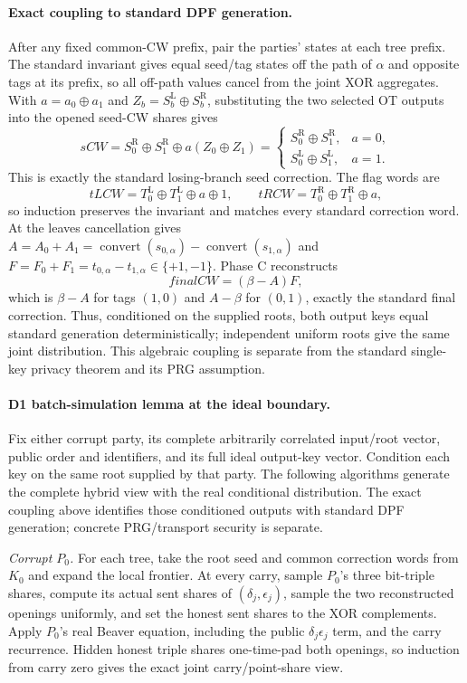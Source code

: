 \documentclass[11pt]{article}
\begin{document}
\paragraph{Exact coupling to standard DPF generation.}
After any fixed common-CW prefix, pair the parties' states at each tree prefix.
The standard invariant gives equal seed/tag states off the path of $\alpha$
and opposite tags at its prefix, so all off-path values cancel from the joint
XOR aggregates. With $a=a_0\oplus a_1$ and
$Z_b=S_b^{\mathrm L}\oplus S_b^{\mathrm R}$, substituting the two selected OT
outputs into the opened seed-CW shares gives
\[
\mathit{sCW}=
S_0^{\mathrm R}\oplus S_1^{\mathrm R}\oplus
a(Z_0\oplus Z_1)
=
\begin{cases}
S_0^{\mathrm R}\oplus S_1^{\mathrm R},&a=0,\\
S_0^{\mathrm L}\oplus S_1^{\mathrm L},&a=1.
\end{cases}
\]
This is exactly the standard losing-branch seed correction. The flag words are
\[
\mathit{tLCW}=T_0^{\mathrm L}\oplus T_1^{\mathrm L}\oplus a\oplus1,
\qquad
\mathit{tRCW}=T_0^{\mathrm R}\oplus T_1^{\mathrm R}\oplus a,
\]
so induction preserves the invariant and matches every standard correction
word. At the leaves cancellation gives
$A=A_0+A_1=\operatorname{convert}(s_{0,\alpha})-\operatorname{convert}(s_{1,\alpha})$ and
$F=F_0+F_1=t_{0,\alpha}-t_{1,\alpha}\in\{+1,-1\}$. Phase C reconstructs
\[
\mathit{finalCW}=(\beta-A)F,
\]
which is $\beta-A$ for tags $(1,0)$ and $A-\beta$ for $(0,1)$, exactly the
standard final correction. Thus, conditioned on the supplied roots, both
output keys equal standard generation deterministically; independent uniform
roots give the same joint distribution. This algebraic coupling is separate
from the standard single-key privacy theorem and its PRG assumption.

\paragraph{D1 batch-simulation lemma at the ideal boundary.}
Fix either corrupt party, its complete arbitrarily correlated input/root
vector, public order and identifiers, and its full ideal output-key vector.
Condition each key on the same root supplied by that party. The following
algorithms generate the complete hybrid view with the real conditional
distribution. The exact coupling above identifies those conditioned outputs
with standard DPF generation; concrete PRG/transport security is separate.

\emph{Corrupt $P_0$.}
For each tree, take the root seed and common correction words from $K_0$ and
expand the local frontier. At every carry, sample $P_0$'s three bit-triple
shares, compute its actual sent shares of $(\delta_j,\epsilon_j)$, sample the
two reconstructed openings uniformly, and set the honest sent shares to the
XOR complements. Apply $P_0$'s real Beaver equation, including the public
$\delta_j\epsilon_j$ term, and the carry recurrence. Hidden honest triple
shares one-time-pad both openings, so induction from carry zero gives the
exact joint carry/point-share view.
\end{document}

